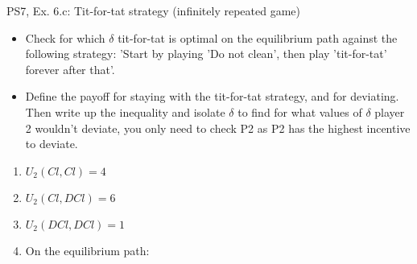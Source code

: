 \begin{frame}{PS7, Ex. 6.c: Tit-for-tat strategy (infinitely repeated game)}
    \begin{itemize}
    \item[(c)] Check for which $\delta$ tit-for-tat is optimal on the equilibrium path against the following strategy: ’Start by playing ’Do not clean’, then play ’tit-for-tat’ forever after that’.
    \end{itemize}
  \begin{multicols}{2}
  \begin{itemize}
      \item[(Step a)] Define the payoff for staying with the tit-for-tat strategy, and for deviating. Then write up the inequality and isolate $\delta$ to find for what values of $\delta$ player 2 wouldn't deviate, you only need to check P2 as P2 has the highest incentive to deviate.
  \end{itemize}
    \vfill\null\columnbreak
    \begin{enumerate}
        \item $U_2(Cl,Cl) = 4$
        \item $U_2(Cl,DCl) = 6$
        \item $U_2(DCl,DCl) = 1$
        \item On the equilibrium path:
    \end{enumerate}
    \vfill\null
  \end{multicols}
\end{frame}

